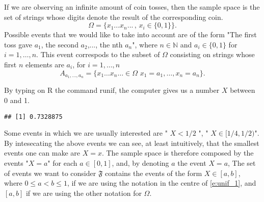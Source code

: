 \begin{example}
	\label{ex:infinite_coin}
If we are observing an infinite amount of coin tosses, then the sample space is the set of strings whose digits denote the result of the corresponding coin. 
	\begin{equation}
		\label{e:infinite_coin}
 \Omega=\{x_1...x_n...\, ,\, x_i\in\{0,1\}\}.
	\end{equation}
	 Possible events that we would like to take into account are of the form "The first toss gave $a_1$, the second $a_2$,..., the nth $a_n$", where $n \in \mathbb N$ and $a_{i} \in \{0,1\}$ for $i = 1, \ldots, n$. This event correspods to the subset of $\Omega$ consisting on strings whose first $n$ elements are $a_i$, for $i = 1,\ldots, n$
		\begin{equation}
			\label{e:infinite_coin_set}
			A_{a_1,\ldots, a_n} = \{x_1\ldots x_n\ldots \in \Omega\,\, x_1 = a_1, \ldots, x_n = a_n \}.
		\end{equation}
\end{example}

\begin{example}
	\label{ex:unif}
	By typing on R the command runif, the computer gives us a number $X$ between 0 and 1. 
\begin{knitrout}
\color{fgcolor}\begin{kframe}
\begin{alltt}
\hldef{(}\hldef{)}
\end{alltt}
\begin{verbatim}
## [1] 0.7328875
\end{verbatim}
\end{kframe}
\end{knitrout}
	Some events in which we are usually interested are " $X < 1/2$ ", " $X \in [1/4, 1/ 2) $". By intesecating the above events we can see, at least intuitively, that the smallest events one can make are $X = x$. The sample space is therefore composed by the events "$ X = a $" for each $a \in [0,1]$, and, by denoting $a$ the event $ X = a$, 
The set of events we want to consider $\mathfrak F$ contains the events of the form $ X \in [a,b]$, where $0 \leq a <  b \leq 1 $, if we are using the notation in the centre of \eqref{e:unif_1}, and $[a,b]$ if we are using the other notation for $\Omega$.    
\end{example}

